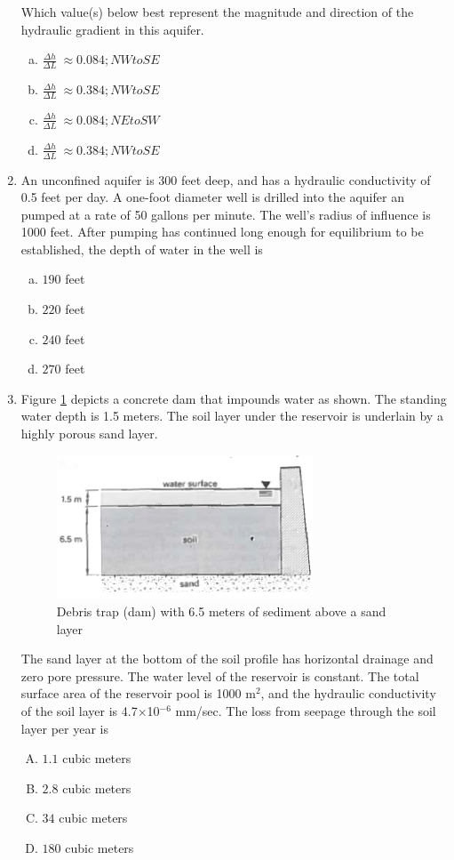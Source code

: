\documentclass[12pt]{article}
\begin{document}
\begin{enumerate}
Which value(s) below best represent the magnitude and direction of the hydraulic gradient in this aquifer. 
\begin{enumerate}[a)]
\item $\frac{\Delta h}{\Delta L}~\approx 0.084; NW to SE$
\item $\frac{\Delta h}{\Delta L}~\approx 0.384; NW to SE$
\item $\frac{\Delta h}{\Delta L}~\approx 0.084; NE to SW$
\item $\frac{\Delta h}{\Delta L}~\approx 0.384; NW to SE$ %
\end{enumerate}
\clearpage
\item An unconfined aquifer is 300 feet deep, and has a hydraulic conductivity of 0.5 feet per day.
A one-foot diameter well is drilled into the aquifer an pumped at a rate of 50 gallons per minute.
The well's radius of influence is 1000 feet. After pumping has continued long enough for equilibrium to be established, the depth of water in the well is
\begin{enumerate} [a)]
\item $190$ feet
\item $220$ feet
\item $240$ feet
\item $270$ feet
\end{enumerate}
\clearpage
\item Figure \ref{fig:debrisDam} depicts a concrete dam that impounds water as shown.  
The standing water depth is 1.5 meters.
The soil layer under the reservoir is underlain by a highly porous sand layer.
\begin{figure}[h!] %
\centering
   \includegraphics[width=3in]{dam.jpg}
   \caption{Debris trap (dam) with 6.5 meters of sediment above a sand layer}
   \label{fig:debrisDam} 
\end{figure}
The sand layer at the bottom of the soil profile has horizontal drainage and zero pore pressure.
The water level of the reservoir is constant.
The total surface area of the reservoir pool is 1000 m$^2$, and the hydraulic conductivity of the soil layer is 4.7$\times$10$^{-6}$ mm/sec.
The loss from seepage through the soil layer per year is
\begin{enumerate} [(A)]
\item $1.1$ cubic meters
\item $2.8$ cubic meters
\item $34$ cubic meters
\item $180$ cubic meters
\end{enumerate}

\end{enumerate}
\end{document}
